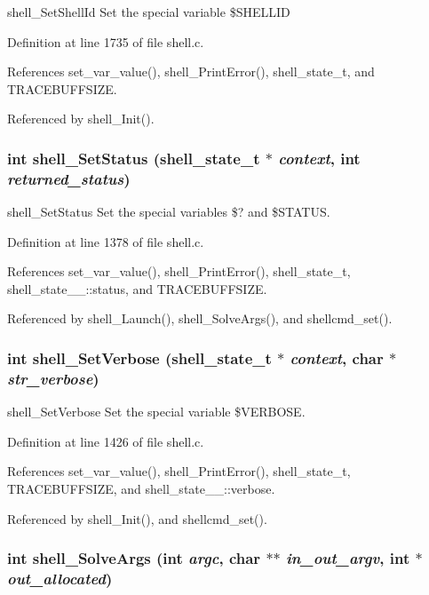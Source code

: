 shell\_\-Set\-Shell\-Id Set the special variable \$SHELLID 

Definition at line 1735 of file shell.c.

References set\_\-var\_\-value(), shell\_\-Print\-Error(), shell\_\-state\_\-t, and TRACEBUFFSIZE.

Referenced by shell\_\-Init().
\subsubsection{\setlength{\rightskip}{0pt plus 5cm}int shell\_\-Set\-Status ({\bf shell\_\-state\_\-t} $\ast$ {\em context}, int {\em returned\_\-status})}\label{shell_8h_a19}


shell\_\-Set\-Status Set the special variables \$? and \$STATUS. 

Definition at line 1378 of file shell.c.

References set\_\-var\_\-value(), shell\_\-Print\-Error(), shell\_\-state\_\-t, shell\_\-state\_\-\_\-::status, and TRACEBUFFSIZE.

Referenced by shell\_\-Launch(), shell\_\-Solve\-Args(), and shellcmd\_\-set().
\subsubsection{\setlength{\rightskip}{0pt plus 5cm}int shell\_\-Set\-Verbose ({\bf shell\_\-state\_\-t} $\ast$ {\em context}, char $\ast$ {\em str\_\-verbose})}\label{shell_8h_a21}


shell\_\-Set\-Verbose Set the special variable \$VERBOSE. 

Definition at line 1426 of file shell.c.

References set\_\-var\_\-value(), shell\_\-Print\-Error(), shell\_\-state\_\-t, TRACEBUFFSIZE, and shell\_\-state\_\-\_\-::verbose.

Referenced by shell\_\-Init(), and shellcmd\_\-set().
\subsubsection{\setlength{\rightskip}{0pt plus 5cm}int shell\_\-Solve\-Args (int {\em argc}, char $\ast$$\ast$ {\em in\_\-out\_\-argv}, int $\ast$ {\em out\_\-allocated})}\label{shell_8h_a13}


